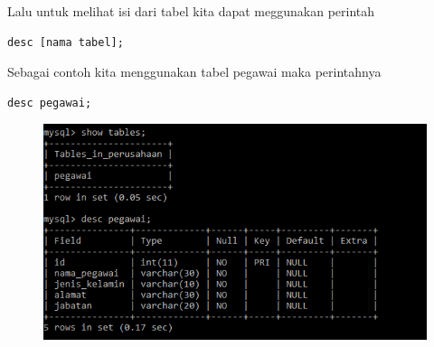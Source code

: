 Lalu untuk melihat isi dari tabel kita dapat meggunakan perintah
\begin{lstlisting}
desc [nama tabel];
\end{lstlisting}
Sebagai contoh kita menggunakan tabel pegawai maka perintahnya
\begin{lstlisting}
desc pegawai;
\end{lstlisting}

\begin{figure}[ht]
\centerline{\includegraphics[width=1\textwidth]
{figures/lihat_tabel}}
\caption{}
\label{lihat}
\end{figure}







